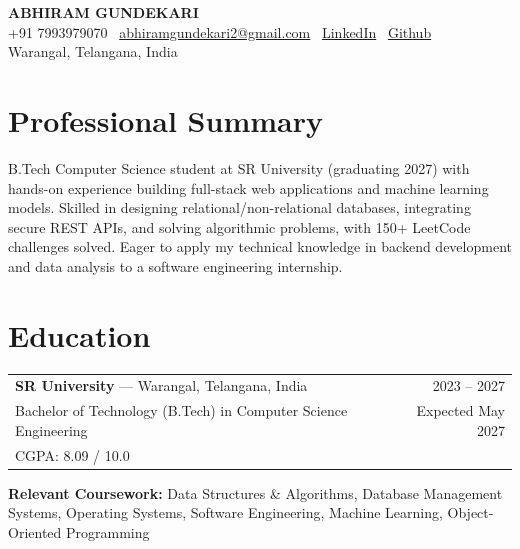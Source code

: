 \documentclass[10pt, a4paper]{article}
\begin{document}
\pagestyle{empty}

\begin{center}
  {\LARGE \textbf{ABHIRAM GUNDEKARI}} \\[4pt]
  +91 7993979070 \textbar\
  \href{mailto:abhiramgundekari2@gmail.com}{abhiramgundekari2@gmail.com} \textbar\
  \href{https://www.linkedin.com/in/abhiram-gundekari-56a740295/}{LinkedIn} \textbar\
  \href{https://github.com/2303A51087}{Github} \\[2pt]
  Warangal, Telangana, India
\end{center}

\vspace{2pt}

\section*{Professional Summary}
\vspace{1pt}
B.Tech Computer Science student at SR University (graduating 2027) with hands-on experience building full-stack web applications and machine learning models. Skilled in designing relational/non-relational databases, integrating secure REST APIs, and solving algorithmic problems, with 150+ LeetCode challenges solved. Eager to apply my technical knowledge in backend development and data analysis to a software engineering internship.

\section*{Education}
\vspace{1pt}
\begin{tabularx}{\textwidth}{@{}X r@{}}
  \textbf{SR University} — Warangal, Telangana, India & 2023 – 2027 \\
  Bachelor of Technology (B.Tech) in Computer Science Engineering & Expected May 2027 \\
  CGPA: 8.09 / 10.0 & \\
\end{tabularx}

\vspace{2pt}
\textbf{Relevant Coursework:} Data Structures \& Algorithms, Database Management Systems,
Operating Systems, Software Engineering, Machine Learning, Object-Oriented Programming

\end{document}

